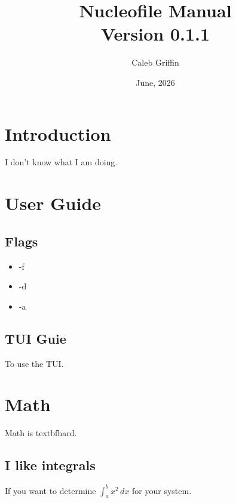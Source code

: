 \documentclass[12pt, letterpaper]{article}
\title{Nucleofile Manual\\[0.12in] \large Version 0.1.1}
\author{Caleb Griffin}
\date{June, 2026}
\begin{document}
\maketitle
\thispagestyle{empty}

\pagebreak
\tableofcontents
\pagebreak

\section{Introduction}
I don't know what I am doing.

\section{User Guide}

\subsection{Flags}
\begin{itemize}
\item -f
\item -d
\item -a
\end{itemize}

\subsection{TUI Guie}
To use the TUI.

\section{Math}
Math is textbf{hard}.

\subsection{I like integrals}
If you want to determine \(\int_a^b x^2\,dx\) for your system.
\end{document}
